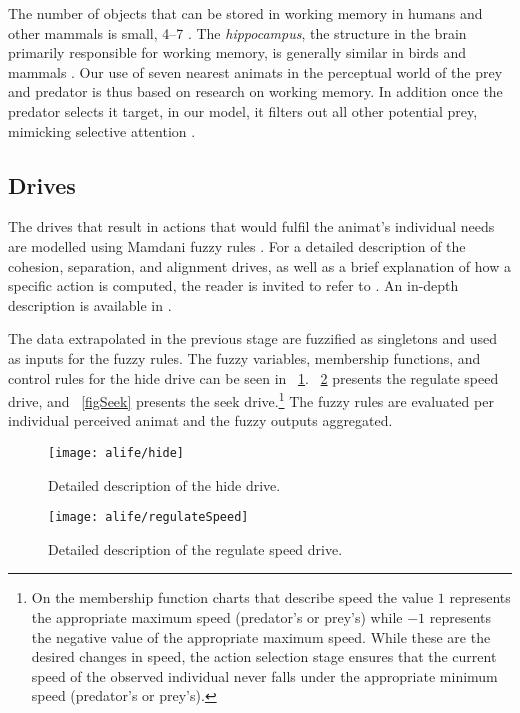 \begin{subappendices}
The number of objects that can be stored in working memory in humans and other mammals is small, 4--7 \cite{ballerini2008interaction,engle1999individual}. The \emph{hippocampus}, the structure in the brain primarily responsible for working memory, is generally similar in birds and mammals \cite{sherry1989hippocampus}. Our use of seven nearest animats in the perceptual world of the prey and predator is thus based on research on working memory. In addition once the predator selects it target, in our model, it filters out all other potential prey, mimicking selective attention \cite{wiederman2012selective}.

\subsection{Drives}
The drives that result in actions that would fulfil the animat's individual needs are modelled using Mamdani fuzzy rules \cite{mamdani1974application}. For a detailed description of the cohesion, separation, and alignment drives, as well as a brief explanation of how a specific action is computed, the reader is invited to refer to \cite{lebarbajec2005simulating}. An in-depth description is available in \cite{lebarbajec2005fuzzy}.

The data extrapolated in the previous stage are fuzzified as singletons and used as inputs for the fuzzy rules. The fuzzy variables, membership functions, and control rules for the hide drive can be seen in \figurename~\ref{figHide}. \figurename~\ref{figRegulateSpeed} presents the regulate speed drive, and \figurename~\ref{figSeek} presents the seek drive.\footnote{On the membership function charts that describe speed the value $1$ represents the appropriate maximum speed (predator's or prey's) while $-1$ represents the negative value of the appropriate maximum speed. While these are the desired changes in speed, the action selection stage ensures that the current speed of the observed individual never falls under the appropriate minimum speed (predator's or prey's).} The fuzzy rules are evaluated per individual perceived animat and the fuzzy outputs aggregated.

\begin{figure}
  \texttt{[image: alife/hide]}
  \caption{Detailed description of the hide drive.}
  \label{figHide}
\end{figure}

\begin{figure}
  \parbox[c][.33\textheight]{\figurewidth}{\texttt{[image: alife/regulateSpeed]}}
  \caption{Detailed description of the regulate speed drive.}
  \label{figRegulateSpeed}
\end{figure}


\end{subappendices}
